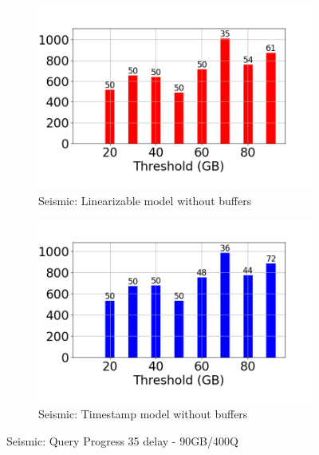 \begin{figure}
\begin{subfigure}[c]{0.48\textwidth}
		\includegraphics[width=1\textwidth]	 {figures/Experiments/Dynamic/SEISMIC/35/average_query_time_per_batch_version_999777016_10485760_10_delay[35].png}
		\caption{Seismic: Linearizable model without buffers}
		\label{fig:logical-ts-no-35-seismic}
	\end{subfigure}
	\begin{subfigure}[c]{0.48\textwidth}
		\includegraphics[width=1\textwidth]	 {figures/Experiments/Dynamic/SEISMIC/35/average_query_time_per_batch_version_999777017_10485760_10_delay[35].png}
		\caption{Seismic: Timestamp model without buffers}
		\label{fig:system-ts-no-35-seismic}
	\end{subfigure}
	\caption{Seismic: Query Progress 35 delay - 90GB/400Q}
	\label{fig:query-progress-35-seismic}
\end{figure}
